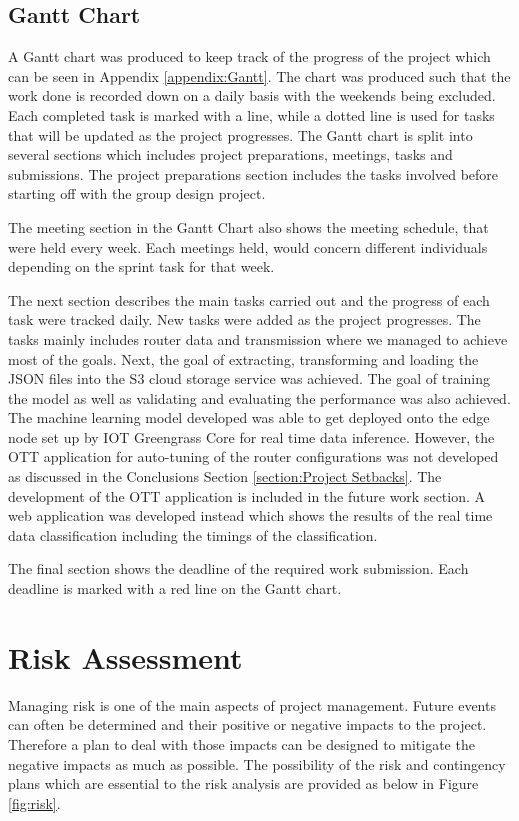 \subsection{Gantt Chart}
\label{gantt_chart}
A Gantt chart was produced to keep track of the progress of the project which can be seen in Appendix \ref{appendix:Gantt}. The chart was produced such that the work done is recorded down on a daily basis with the weekends being excluded. Each completed task is marked with a line, while a dotted line is used for tasks that will be updated as the project progresses. The Gantt chart is split into several sections which includes project preparations, meetings, tasks and submissions. The project preparations section includes the tasks involved before starting off with the group design project. 

The meeting section in the Gantt Chart also shows the meeting schedule, that were held every week. Each meetings held, would concern different individuals depending on the sprint task for that week. 

The next section describes the main tasks carried out and the progress of each task were tracked daily. New tasks were added as the project progresses. The tasks mainly includes router data and transmission where we managed to achieve most of the goals. Next, the goal of extracting, transforming and loading the JSON files into the S3 cloud storage service was achieved. The goal of training the model as well as validating and evaluating the performance was also achieved. The machine learning model developed was able to get deployed onto the edge node set up by IOT Greengrass Core for real time data inference. However, the OTT application for auto-tuning of the router configurations was not developed as discussed in the Conclusions Section \ref{section:Project Setbacks}. The development of the OTT application is included in the future work section. A web application was developed instead which shows the results of the real time data classification including the timings of the classification.

The final section shows the deadline of the required work submission. Each deadline is marked with a red line on the Gantt chart.

\section{Risk Assessment}
Managing risk is one of the main aspects of project management. Future events can often be determined and their positive or negative impacts to the project. Therefore a plan to deal with those impacts can be designed to mitigate the negative impacts as much as possible. The possibility of the risk and contingency plans which are essential to the risk analysis are provided as below in Figure \ref{fig:risk}.

